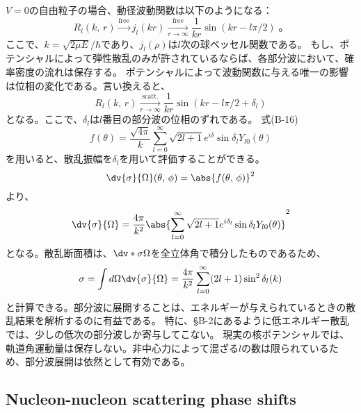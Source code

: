 \documentclass[a4paper,11pt,uplatex]{jsarticle}
\begin{document}
$V=0$の自由粒子の場合、動径波動関数は以下のようになる：
\begin{equation}
  R_l(k,\,r)\xrightarrow[]{\text{free}} j_l(kr)\xrightarrow[r\to\infty]{\text{free}} \frac{1}{kr}\sin(kr-l\pi/2)\;。
\end{equation}
ここで、$k=\sqrt{2\mu E}/\hbar$であり、$j_l(\rho)$は$l$次の球ベッセル関数である。
もし、ポテンシャルによって弾性散乱のみが許されているならば、各部分波において、確率密度の流れは保存する。
ポテンシャルによって波動関数に与える唯一の影響は位相の変化である。言い換えると、
\begin{equation}
  R_l(k,\,r)\xrightarrow[r\to\infty]{\text{scatt.}} \frac{1}{kr}\sin(kr-l\pi/2+\delta_l)
\end{equation}
となる。ここで、$\delta_l$は$l$番目の部分波の位相のずれである。
式(B-16)
\begin{equation}
  f(\theta)=\frac{\sqrt{4\pi}}{k}\sum_{l=0}^{\infty}\sqrt{2l+1}e^{i\delta}\sin\delta_l Y_{l0}(\theta)
\end{equation}
を用いると、散乱振幅を$\delta_l$を用いて評価することができる。
\begin{equation}
  \dv{\sigma}{\Omega}(\theta,\,\phi)=\abs{f(\theta,\,\phi)}^2
\end{equation}
より、
\begin{equation}
  \dv{\sigma}{\Omega} = \frac{4\pi}{k^2}\abs{\sum_{l=0}^{\infty}\sqrt{2l+1}e^{i\delta_l}\sin\delta_l Y_{l0}(\theta)}^2
\end{equation}
となる。散乱断面積は、$\dv*{\sigma}{\Omega}$を全立体角で積分したものであるため、
\begin{equation}
  \sigma=\int d\Omega \dv{\sigma}{\Omega} = \frac{4\pi}{k^2}\sum_{l=0}^{\infty}(2l+1)\sin^2\delta_l(k)
\end{equation}
と計算できる。部分波に展開することは、エネルギーが与えられているときの散乱結果を解析するのに有益である。
特に、\S{B-2}にあるように低エネルギー散乱では、少しの低次の部分波しか寄与してこない。
現実の核ポテンシャルでは、軌道角運動量は保存しない。非中心力によって混ざる$l$の数は限られているため、部分波展開は依然として有効である。

\subsection*{Nucleon-nucleon scattering phase shifts}
\end{document}
